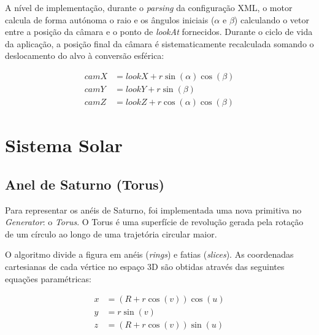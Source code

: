 \documentclass[12pt,a4paper]{article}
\begin{document}
A nível de implementação, durante o \textit{parsing} da configuração XML, o motor calcula de forma autónoma o raio e os ângulos iniciais ($\alpha$ e $\beta$) calculando o vetor entre a posição da câmara e o ponto de \textit{lookAt} fornecidos. Durante o ciclo de vida da aplicação, a posição final da câmara é sistematicamente recalculada somando o deslocamento do alvo à conversão esférica:

\begin{align}
    camX &= lookX + r \sin(\alpha) \cos(\beta) \\
    camY &= lookY + r \sin(\beta) \\
    camZ &= lookZ + r \cos(\alpha) \cos(\beta)
\end{align}
\section{Sistema Solar} 

\subsection{Anel de Saturno (Torus)} 
Para representar os anéis de Saturno, foi implementada uma nova primitiva no \textit{Generator}: o \textit{Torus}. O Torus é uma superfície de revolução gerada pela rotação de um círculo ao longo de uma trajetória circular maior.

O algoritmo divide a figura em anéis (\textit{rings}) e fatias (\textit{slices}). As coordenadas cartesianas de cada vértice no espaço 3D são obtidas através das seguintes equações paramétricas:

\begin{align}
    x &= (R + r \cos(v)) \cos(u) \\
    y &= r \sin(v) \\
    z &= (R + r \cos(v)) \sin(u)
\end{align}
\end{document}
